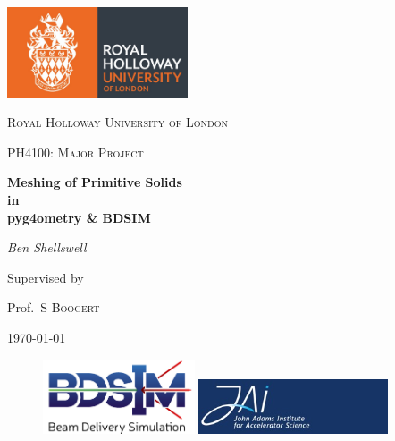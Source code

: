 \documentclass[12pt,a4paper]{article}
\begin{document}
\begin{titlepage}
	\centering
	\includegraphics[width=0.4\textwidth]{Images//Logos//rhul.jpg}\par\vspace{1cm}


	{\scshape\LARGE Royal Holloway University of London \par}
	\vspace{1cm}
	{\scshape\Large PH4100: Major Project\par}
	\vspace{1.5cm}
	{\huge\bfseries Meshing of Primitive Solids\\
	in\\
	pyg4ometry \& BDSIM\par}
	\vspace{2cm}
	{\Large\itshape Ben Shellswell\par}
	\vfill

\begin{abstract}
\centering

\end{abstract}

	\vfill
	
	Supervised by\par
	Prof.~S \textsc{Boogert} 

	{\large \today\par}



\begin{figure}[h]
\centering
\begin{minipage}{.6\textwidth}
  \includegraphics[width=0.4\textwidth]{Images//Logos//BDSIM_Logo.jpg}
\end{minipage}%
\begin{minipage}{.6\textwidth}
  \centering
  \includegraphics[width=0.5\textwidth]{Images//Logos//JAI_Logo.jpeg}
  \end{minipage}
\end{figure}

\end{titlepage}
\leavevmode\thispagestyle{empty}\newpage
\tableofcontents
\thispagestyle{empty}
\newpage
\onecolumn
\end{document}
